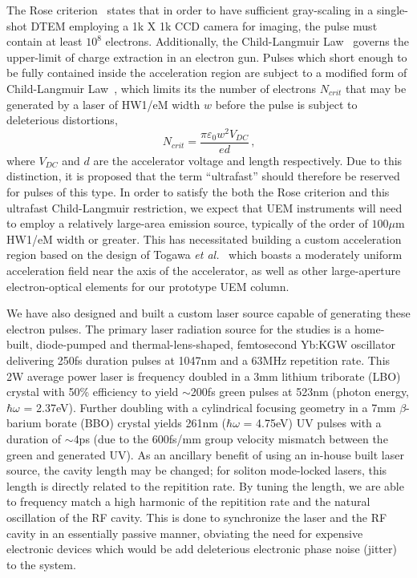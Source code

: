 The Rose criterion~\cite{rose_television_1948} states that in order to have sufficient gray-scaling in a single-shot DTEM employing a 1k X 1k CCD camera for imaging, the pulse must contain at least $10^8$ electrons.
Additionally, the Child-Langmuir Law~\cite{child_discharge_1911,langmuir_effect_1923} governs the upper-limit of charge extraction in an electron gun. 
Pulses which short enough to be fully contained inside the acceleration region are subject to a modified form of Child-Langmuir Law~\cite{valfells_effects_2002}, which limits its the number of electrons $N_{crit}$ that may be generated by a laser of HW1/eM width $w$ before the pulse is subject to deleterious distortions,
\begin{equation}
  N_{crit} = \frac{\pi \varepsilon_0 w^2 V_{DC}}{e d} \,\text{,}
\end{equation}
where $V_{DC}$ and $d$ are the accelerator voltage and length respectively.
Due to this distinction, it is proposed that the term ``ultrafast'' should therefore be reserved for pulses of this type.
In order to satisfy the both the Rose criterion and this ultrafast Child-Langmuir restriction, we expect that UEM instruments will need to employ a relatively large-area emission source, typically of the order of $100\mu\text{m}$ HW1/eM width or greater.
This has necessitated building a custom acceleration region based on the design of Togawa \textit{et al.}~\cite{togawa_ceb6_2007} which boasts a moderately uniform acceleration field near the axis of the accelerator, as well as other large-aperture electron-optical elements for our prototype UEM column.

We have also designed and built a custom laser source capable of generating these electron pulses.
The primary laser radiation source for the studies is a home-built, diode-pumped and thermal-lens-shaped, femtosecond Yb:KGW oscillator~\cite{berger_high-power_2008} delivering 250fs duration pulses at 1047nm and a 63MHz repetition rate.
This 2W average power laser is frequency doubled in a 3mm lithium triborate (LBO) crystal with 50\% efficiency to yield $\sim$200fs green pulses at 523nm (photon energy, $\hbar \omega$ = 2.37eV).
Further doubling with a cylindrical focusing geometry in a 7mm $\beta$-barium borate (BBO) crystal yields 261nm ($\hbar \omega$ = 4.75eV) UV pulses with a duration of $\sim$4ps (due to the 600fs/mm group velocity mismatch between the green and generated UV).
As an ancillary benefit of using an in-house built laser source, the cavity length may be changed; for soliton mode-locked lasers, this length is directly related to the repitition rate.
By tuning the length, we are able to frequency match a high harmonic of the repitition rate and the natural oscillation of the RF cavity.
This is done to synchronize the laser and the RF cavity in an essentially passive manner, obviating the need for expensive electronic devices which would be add deleterious electronic phase noise (jitter) to the system.

